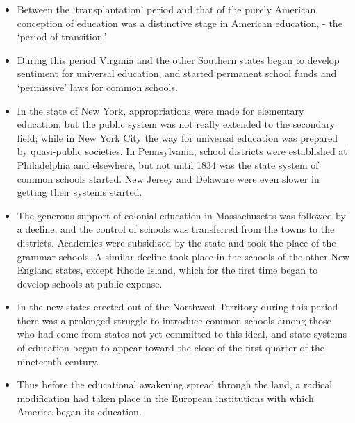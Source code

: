 \documentclass[
]{book}
\providecommand{\tightlist}{%
  \setlength{\itemsep}{0pt}\setlength{\parskip}{0pt}}
\begin{document}
\begin{itemize}
\tightlist
\item
  Between the `transplantation' period and that of the purely American conception of education was a distinctive stage in American education, - the `period of transition.'
\item
  During this period Virginia and the other Southern states began to develop sentiment for universal education, and started permanent school funds and `permissive' laws for common schools.
\item
  In the state of New York, appropriations were made for elementary education, but the public system was not really extended to the secondary field; while in New York City the way for universal education was prepared by quasi-public societies. In Pennsylvania, school districts were established at Philadelphia and elsewhere, but not until 1834 was the state system of common schools started. New Jersey and Delaware were even slower in getting their systems started.
\item
  The generous support of colonial education in Massachusetts was followed by a decline, and the control of schools was transferred from the towns to the districts. Academies were subsidized by the state and took the place of the grammar schools. A similar decline took place in the schools of the other New England states, except Rhode Island, which for the first time began to develop schools at public expense.
\item
  In the new states erected out of the Northwest Territory during this period there was a prolonged struggle to introduce common schools among those who had come from states not yet committed to this ideal, and state systems of education began to appear toward the close of the first quarter of the nineteenth century.
\item
  Thus before the educational awakening spread through the land, a radical modification had taken place in the European institutions with which America began its education.
\end{itemize}
\end{document}
